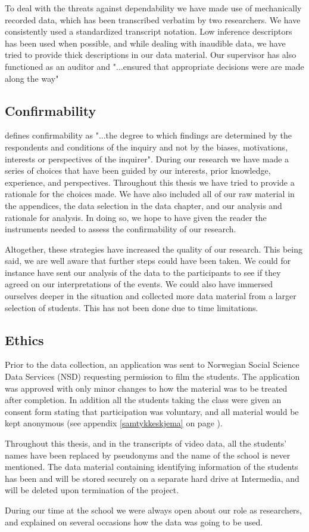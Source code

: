 To deal with the threats against dependability we have made use of mechanically recorded data, which has been transcribed verbatim by two researchers. We have consistently used a standardized transcript notation. Low inference descriptors has been used when possible, and while dealing with inaudible data, we have tried to provide thick descriptions in our data material. Our supervisor has also functioned as an auditor and "...ensured that appropriate decisions were are made along the way" \citep{baxter1997evaluating}

\subsection{Confirmability}
\citet{lincoln1985naturalistic} defines confirmability as "...the degree to which findings are determined by the respondents and conditions of the inquiry and not by the biases, motivations, interests or perspectives of the inquirer". During our research we have made a series of choices that have been guided by our interests, prior knowledge, experience, and perspectives. Throughout this thesis we have tried to provide a rationale for the choices made. We have also included all of our raw material in the appendices, the data selection in the data chapter, and our analysis and rationale for analysis. In doing so, we hope to have given the reader the instruments needed to assess the confirmability of our research.  

Altogether, these strategies have increased the quality of our research. This being said, we are well aware that further steps could have been taken. We could for instance have sent our analysis of the data to the participants to see if they agreed on our interpretations of the events. We could also have immersed ourselves deeper in the situation and collected more data material from a larger selection of students. This has not been done due to time limitations. 

\subsection{Ethics}
Prior to the data collection, an application was sent to Norwegian Social Science Data Services (NSD) requesting permission to film the students. The application was approved with only minor changes to how the material was to be treated after completion. In addition all the students taking the class were given an consent form stating that participation was voluntary, and all material would be kept anonymous (see appendix \ref{samtykkeskjema} on page \pageref{samtykkeskjema}). 

Throughout this thesis, and in the transcripts of video data, all the students' names have been replaced by pseudonyms and the name of the school is never mentioned. The data material containing identifying information of the students has been and will be stored securely on a separate hard drive at Intermedia, and will be deleted  upon termination of the project. 

During our time at the school we were always open about our role as researchers, and explained on several occasions how the data was going to be used. 

